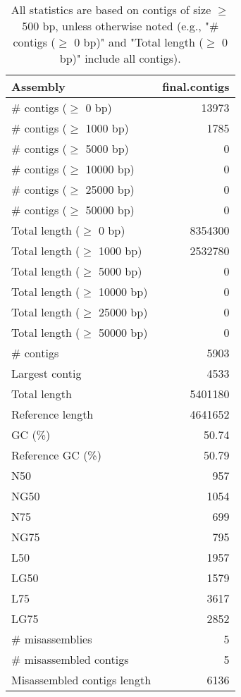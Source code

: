 \documentclass[12pt,a4paper]{article}
\begin{document}
\begin{table}[ht]
\begin{center}
\caption{All statistics are based on contigs of size $\geq$ 500 bp, unless otherwise noted (e.g., "\# contigs ($\geq$ 0 bp)" and "Total length ($\geq$ 0 bp)" include all contigs).}
\begin{tabular}{|l*{1}{|r}|}
\hline
Assembly & final.contigs \\ \hline
\# contigs ($\geq$ 0 bp) & 13973 \\ \hline
\# contigs ($\geq$ 1000 bp) & 1785 \\ \hline
\# contigs ($\geq$ 5000 bp) & 0 \\ \hline
\# contigs ($\geq$ 10000 bp) & 0 \\ \hline
\# contigs ($\geq$ 25000 bp) & 0 \\ \hline
\# contigs ($\geq$ 50000 bp) & 0 \\ \hline
Total length ($\geq$ 0 bp) & 8354300 \\ \hline
Total length ($\geq$ 1000 bp) & 2532780 \\ \hline
Total length ($\geq$ 5000 bp) & 0 \\ \hline
Total length ($\geq$ 10000 bp) & 0 \\ \hline
Total length ($\geq$ 25000 bp) & 0 \\ \hline
Total length ($\geq$ 50000 bp) & 0 \\ \hline
\# contigs & 5903 \\ \hline
Largest contig & 4533 \\ \hline
Total length & 5401180 \\ \hline
Reference length & 4641652 \\ \hline
GC (\%) & 50.74 \\ \hline
Reference GC (\%) & 50.79 \\ \hline
N50 & 957 \\ \hline
NG50 & 1054 \\ \hline
N75 & 699 \\ \hline
NG75 & 795 \\ \hline
L50 & 1957 \\ \hline
LG50 & 1579 \\ \hline
L75 & 3617 \\ \hline
LG75 & 2852 \\ \hline
\# misassemblies & 5 \\ \hline
\# misassembled contigs & 5 \\ \hline
Misassembled contigs length & 6136 \\ \hline

\end{tabular}
\end{center}
\end{table}
\end{document}
